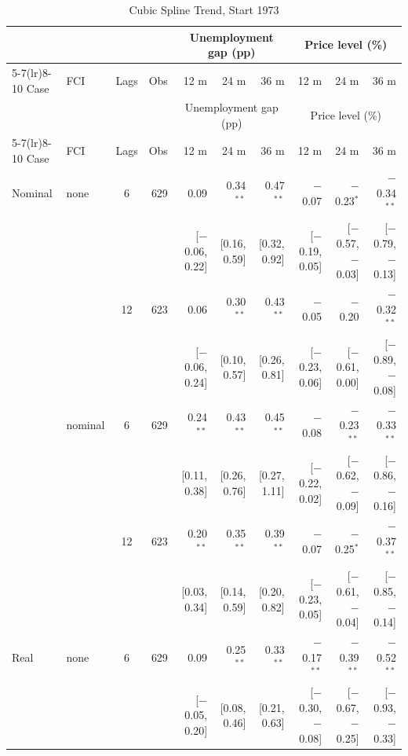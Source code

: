 \begingroup\scriptsize\setlength{\tabcolsep}{0.9pt}
\begin{longtable}{llcrrrrrrr}
\caption{Cubic Spline Trend, Start 1973}\label{tab:appF273}\\
\toprule
 & & & & \multicolumn{3}{c}{Unemployment gap (pp)} & \multicolumn{3}{c}{Price level (\%)}\\ \cmidrule(lr){5-7}\cmidrule(lr){8-10}
Case & FCI & Lags & Obs & 12 m & 24 m & 36 m & 12 m & 24 m & 36 m\\
\midrule\endfirsthead
\toprule
 & & & & \multicolumn{3}{c}{Unemployment gap (pp)} & \multicolumn{3}{c}{Price level (\%)}\\ \cmidrule(lr){5-7}\cmidrule(lr){8-10}
Case & FCI & Lags & Obs & 12 m & 24 m & 36 m & 12 m & 24 m & 36 m\\
\midrule\endhead
\bottomrule\endfoot
Nominal & none & 6 & 629 & 0.09 & 0.34$^{**}$ & 0.47$^{**}$ & $-$0.07 & $-$0.23$^{*}$ & $-$0.34$^{**}$\\
 & & & & {\scriptsize [$-$0.06, 0.22]} & {\scriptsize [0.16, 0.59]} & {\scriptsize [0.32, 0.92]} & {\scriptsize [$-$0.19, 0.05]} & {\scriptsize [$-$0.57, $-$0.03]} & {\scriptsize [$-$0.79, $-$0.13]}\\
 &  & 12 & 623 & 0.06 & 0.30$^{**}$ & 0.43$^{**}$ & $-$0.05 & $-$0.20 & $-$0.32$^{**}$\\
 & & & & {\scriptsize [$-$0.06, 0.24]} & {\scriptsize [0.10, 0.57]} & {\scriptsize [0.26, 0.81]} & {\scriptsize [$-$0.23, 0.06]} & {\scriptsize [$-$0.61, 0.00]} & {\scriptsize [$-$0.89, $-$0.08]}\\
 & nominal & 6 & 629 & 0.24$^{**}$ & 0.43$^{**}$ & 0.45$^{**}$ & $-$0.08 & $-$0.23$^{**}$ & $-$0.33$^{**}$\\
 & & & & {\scriptsize [0.11, 0.38]} & {\scriptsize [0.26, 0.76]} & {\scriptsize [0.27, 1.11]} & {\scriptsize [$-$0.22, 0.02]} & {\scriptsize [$-$0.62, $-$0.09]} & {\scriptsize [$-$0.86, $-$0.16]}\\
 &  & 12 & 623 & 0.20$^{**}$ & 0.35$^{**}$ & 0.39$^{**}$ & $-$0.07 & $-$0.25$^{*}$ & $-$0.37$^{**}$\\
 & & & & {\scriptsize [0.03, 0.34]} & {\scriptsize [0.14, 0.59]} & {\scriptsize [0.20, 0.82]} & {\scriptsize [$-$0.23, 0.05]} & {\scriptsize [$-$0.61, $-$0.04]} & {\scriptsize [$-$0.85, $-$0.14]}\\
\addlinespace
Real & none & 6 & 629 & 0.09 & 0.25$^{**}$ & 0.33$^{**}$ & $-$0.17$^{**}$ & $-$0.39$^{**}$ & $-$0.52$^{**}$\\
 & & & & {\scriptsize [$-$0.05, 0.20]} & {\scriptsize [0.08, 0.46]} & {\scriptsize [0.21, 0.63]} & {\scriptsize [$-$0.30, $-$0.08]} & {\scriptsize [$-$0.67, $-$0.25]} & {\scriptsize [$-$0.93, $-$0.33]}\\

\end{longtable}
